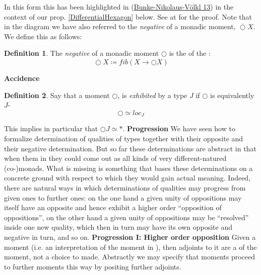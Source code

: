 \documentclass[12pt,titlepage]{article}
\theoremstyle{plain}
\theoremstyle{definition}
\newtheorem{defn}{Definition}
\theoremstyle{remark}
\begin{document}
In this form this has been highlighted in (\hyperlink{BunkeNikolausVoelkl13}{Bunke-Nikolaus-Völkl 13}) in the context of our prop. \ref{DifferentialHexagon} below. See at  for the proof.
Note that in the diagram we have also referred to the \emph{negative} of a monadic moment, $\overline{\bigcirc} X$. We define this as follows:
\begin{defn}
\label{NegativeMonadicMoment}\hypertarget{NegativeMonadicMoment}{}
The \emph{negative} of a monadic moment $\bigcirc$ is the  of the :
\begin{displaymath}
\overline{\bigcirc} X \coloneqq fib(X \to \bigcirc X)
\end{displaymath}
\end{defn}
\textbf{Accidence}
\begin{defn}
\label{Localization}\hypertarget{Localization}{}
Say that a moment $\bigcirc$, is \emph{exhibited} by a type $J$ if $\bigcirc$ is equivalently $J$-
\begin{displaymath}
\bigcirc \simeq loc_{J}
\end{displaymath}
\end{defn}
This implies in particular that $\bigcirc J \simeq \ast$.
\textbf{Progression}
We have seen how to formalize determination of qualities of types together with their opposite and their negative determination. But so far these determinations are abstract in that when  them in  they could come out as all kinds of very different-natured (co-)monads. What is missing is something that bases these determinations on a concrete ground with respect to which they would gain actual meaning.
Indeed, there are natural ways in which determinations of qualities may progress from given ones to further ones: on the one hand a given unity of oppositions may itself have an opposite and hence exhibit a higher order ``opposition of oppositions'', on the other hand a given unity of oppositions may be ``resolved'' inside one new quality, which then in turn may have its own opposite and negative in turn, and so on.
\textbf{Progression I: Higher order opposition}
Given a  moment (i.e. an interpretation of the moment in ), then adjoints to it are a  of the moment, not a choice to made. Abstractly we may specify that moments proceed to further moments this way by positing further adjoints.
\end{document}
